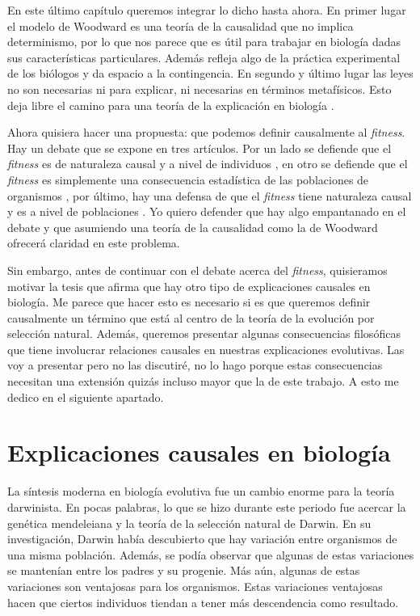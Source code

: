 En este último capítulo queremos integrar lo dicho hasta ahora. En primer lugar el modelo de Woodward es una teoría de la causalidad que no implica determinismo, por lo que nos parece que es útil para trabajar en biología dadas sus características particulares. Además refleja algo de la práctica experimental de los biólogos y da espacio a la contingencia. En segundo y último lugar las leyes no son necesarias ni para explicar, ni necesarias en términos metafísicos. Esto deja libre el camino para una teoría de la explicación en biología \cite{Brandon1997}.

Ahora quisiera hacer una propuesta: que podemos definir causalmente al \emph{fitness}. Hay un debate que se expone en tres artículos. Por un lado se defiende que el \emph{fitness} es de naturaleza causal y a nivel de individuos \cite{Bouchard2004}, en otro se defiende que el \emph{fitness} es simplemente una consecuencia estadística de las poblaciones de organismos \cite{Walsh2002}, por último, hay una defensa de que el \emph{fitness} tiene naturaleza causal y es a nivel de poblaciones \cite{Millstein2006}. Yo quiero defender que hay algo empantanado en el debate y que asumiendo una teoría de la causalidad como la de Woodward ofrecerá claridad en este problema.

Sin embargo, antes de continuar con el debate acerca del \emph{fitness}, quisieramos motivar la tesis que afirma que hay otro tipo de explicaciones causales en biología. Me parece que hacer esto es necesario si es que queremos definir causalmente un término que está al centro de la teoría de la evolución por selección natural. Además, queremos presentar algunas consecuencias filosóficas que tiene involucrar relaciones causales en nuestras explicaciones evolutivas. Las voy a presentar pero no las discutiré, no lo hago porque estas consecuencias necesitan una extensión quizás incluso mayor que la de este trabajo. A esto me dedico en el siguiente apartado.

\section{Explicaciones causales en biología}

\noindent La síntesis moderna en biología evolutiva fue un cambio enorme para la teoría darwinista. En pocas palabras, lo que se hizo durante este periodo fue acercar la genética mendeleiana y la teoría de la selección natural de Darwin. En su investigación, Darwin había descubierto que hay variación entre organismos de una misma población. Además, se podía observar que algunas de estas variaciones se mantenían entre los padres y su progenie. Más aún, algunas de estas variaciones son ventajosas para los organismos. Estas variaciones ventajosas hacen que ciertos individuos tiendan a tener más descendencia como resultado.

